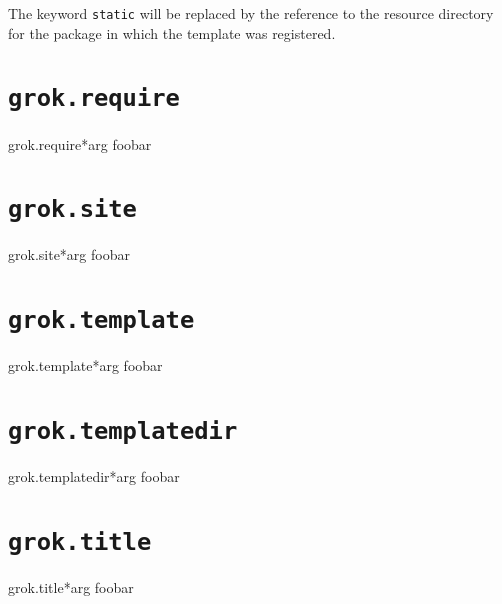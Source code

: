 \documentclass[10pt,a4paper,english]{manual}
\begin{document}
The keyword \texttt{static} will be replaced by the reference to
the resource directory for the package in which the template was
registered.



\section{\texttt{grok.require}}
\begin{funcdesc}{grok.require}{*arg}
foobar
\end{funcdesc}



\section{\texttt{grok.site}}
\begin{funcdesc}{grok.site}{*arg}
foobar
\end{funcdesc}



\section{\texttt{grok.template}}
\begin{funcdesc}{grok.template}{*arg}
foobar
\end{funcdesc}



\section{\texttt{grok.templatedir}}
\begin{funcdesc}{grok.templatedir}{*arg}
foobar
\end{funcdesc}



\section{\texttt{grok.title}}
\begin{funcdesc}{grok.title}{*arg}
foobar
\end{funcdesc}
\end{document}
